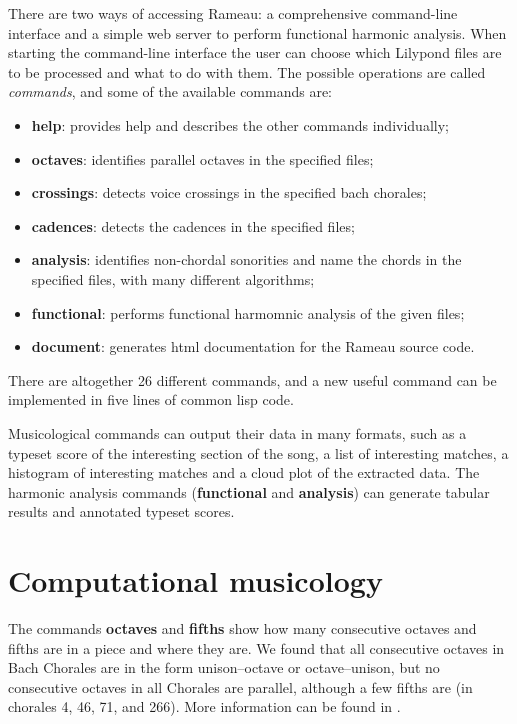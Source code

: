 There are two ways of accessing Rameau: a comprehensive command-line
interface and a simple web server to perform functional harmonic
analysis. When starting the command-line interface the user can choose
which Lilypond files are to be processed and what to do with
them. The possible operations are called \textit{commands}, and some
of the available commands are:
\begin{itemize}
\item \textbf{help}: provides help and describes the other commands
  individually;
\item \textbf{octaves}: identifies parallel octaves in the specified files;
\item \textbf{crossings}: detects voice crossings in the specified
  bach chorales;
\item \textbf{cadences}: detects the cadences in the specified files;
\item \textbf{analysis}: identifies non-chordal sonorities and name
  the chords in the specified files, with many different algorithms;
\item \textbf{functional}: performs functional harmomnic analysis of
  the given files;
\item \textbf{document}: generates html documentation for the Rameau
  source code.
\end{itemize}
There are altogether 26 different commands, and a new useful command
can be implemented in five lines of common lisp code.

Musicological commands can output their data in many formats, such as
a typeset score of the interesting section of the song, a list of
interesting matches, a histogram of interesting matches and a cloud
plot of the extracted data. The harmonic analysis commands
(\textbf{functional} and \textbf{analysis}) can generate tabular
results and annotated typeset scores.

\section{Computational musicology}
\label{sec:comp-music}

The commands \textbf{octaves} and \textbf{fifths} show how many
consecutive octaves and fifths are in a piece and where they are. We
found that all consecutive octaves in Bach Chorales are in the form
unison--octave or octave--unison, but no consecutive octaves in all
Chorales are parallel, although a few fifths are (in chorales 4, 46,
71, and 266). More information can be found in
\cite{kroger08:musicologia}.



